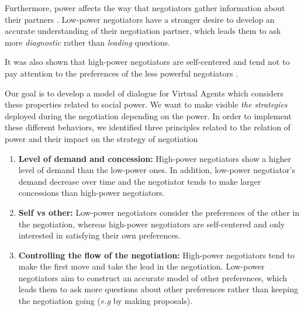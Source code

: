 \documentclass{llncs}
\begin{document}
		Furthermore, power affects the way that negotiators gather information about their partners \cite{de2004influence}. Low-power negotiators have a stronger desire to develop an accurate understanding of their negotiation partner, which leads them to ask more \emph{diagnostic} rather than \emph{leading} questions.
		
		It was also shown that high-power negotiators are self-centered and tend  not to pay attention to the preferences of the less powerful negotiators \cite{fiske1993controlling,de1995impact}.
		
		Our goal is to develop a model of dialogue for Virtual Agents which considers these properties related to social power. We want to make visible \emph{the strategies} deployed during the negotiation depending on the power. In order to implement these different behaviors, we identified three principles related to the relation of power and their impact on the strategy of negotiation
		\begin{enumerate}
			\item \textbf{Level of demand and concession:} High-power negotiators show a higher level of demand than the low-power ones. In addition, low-power negotiator's demand decrease over time and the negotiator tends to make larger concessions than high-power negotiators. \cite{de1995impact}
			
			\item \textbf{Self vs other:} Low-power negotiators consider the preferences of the other in the negotiation, whereas high-power negotiators are self-centered and only interested in satisfying their own preferences. \cite{fiske1993controlling,de1995impact}
			
			\item \textbf{Controlling the flow of the negotiation:}
			High-power negotiators tend to make the first move \cite{magee2007power} and take the lead in the negotiation. Low-power negotiators aim to construct an accurate model of other preferences, which leads them to ask more questions about other preferences rather than keeping the negotiation going (\emph{e.g} by making proposals)\cite{de2004influence}. 
			
		\end{enumerate}
		
\end{document}
